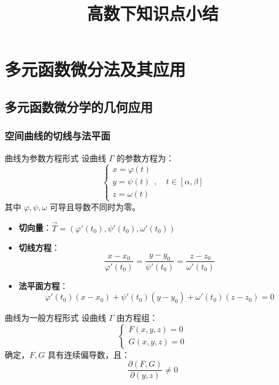 \documentclass[12pt]{book}
\newcommand{\hei}{\CJKfamily{hei}}      %
\theoremstyle{mythm}
\begin{document}
\title{高数下知识点小结}
\maketitle

\setcounter{chapter}{8}

\chapter{多元函数微分法及其应用}

\setcounter{section}{5}

\section{多元函数微分学的几何应用}

\subsection{空间曲线的切线与法平面}

{\hei 曲线为参数方程形式} 设曲线 $\Gamma$ 的参数方程为：
\[
\begin{cases}
x = \varphi(t) \\
y = \psi(t) \\
z = \omega(t)
\end{cases}, \quad t \in [\alpha, \beta]
\]
其中 $\varphi, \psi, \omega$ 可导且导数不同时为零。

\begin{itemize}
    \item \textbf{切向量}：$\vec{T} = (\varphi'(t_0), \psi'(t_0), \omega'(t_0))$
    \item \textbf{切线方程}：
    \[
    \frac{x - x_0}{\varphi'(t_0)} = \frac{y - y_0}{\psi'(t_0)} = \frac{z - z_0}{\omega'(t_0)}
    \]
    \item \textbf{法平面方程}：
    \[
    \varphi'(t_0)(x - x_0) + \psi'(t_0)(y - y_0) + \omega'(t_0)(z - z_0) = 0
    \]
\end{itemize}

{\hei 曲线为一般方程形式} 设曲线 $\Gamma$ 由方程组：
\[
\begin{cases}
F(x, y, z) = 0 \\
G(x, y, z) = 0
\end{cases}
\]
确定，$F, G$ 具有连续偏导数，且：
\[
\frac{\partial(F, G)}{\partial(y, z)} \neq 0
\]
\end{document}
